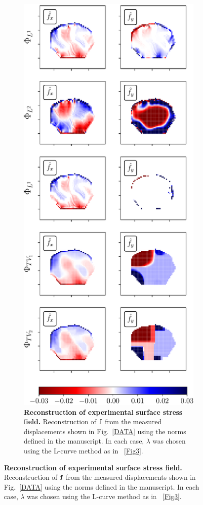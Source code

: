 \documentclass[aps,prl,reprint,twocolumn,groupedaddress,showpacs]{revtex4}
\def\f{{\bf f}}
\begin{document}
\begin{figure}
\begin{figure}
\includegraphics[width=\linewidth]{fig9}
\caption{\textbf{Reconstruction of experimental surface stress field.}
  Reconstruction of $\f$ from the measured displacements shown in
  Fig.~\ref{DATA} using the norms defined in the manuscript. In each 
  case, $\lambda$ was chosen using the L-curve method as in ~\ref{Fig3}.}
\label{DATA2}
\end{figure}


\end{figure}
\end{document}
